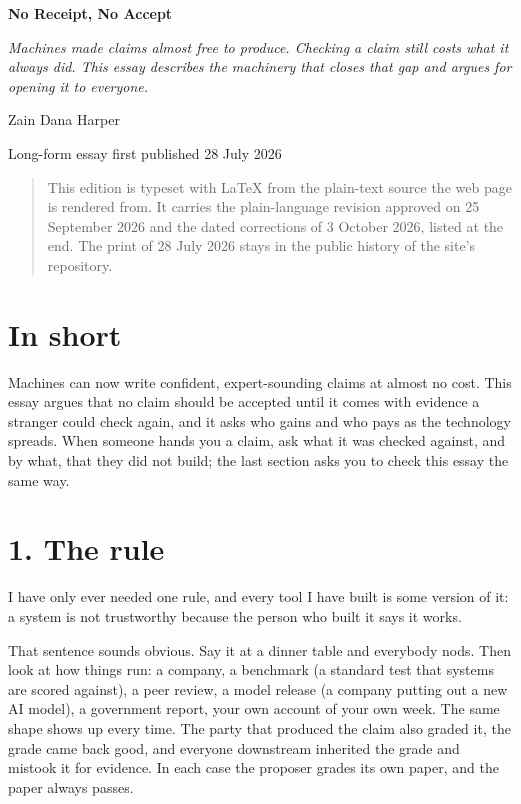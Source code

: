 \documentclass[11pt]{article}
\begin{document}
\begin{center}
{\LARGE\bfseries No Receipt, No Accept\par}
\medskip
{\large\emph{Machines made claims almost free to produce. Checking a claim still costs what it always did. This essay describes the machinery that closes that gap and argues for opening it to everyone.}\par}
\medskip
Zain Dana Harper\par
{\small Long-form essay \textperiodcentered{} first published 28 July 2026\par}
\end{center}

\begin{quote}\small
This edition is typeset with LaTeX from the plain-text source the web page is rendered from. It carries the plain-language revision approved on 25 September 2026 and the dated corrections of 3 October 2026, listed at the end. The print of 28 July 2026 stays in the public history of the site's repository.
\end{quote}

\section*{In short}

Machines can now write confident, expert-sounding claims at almost no cost. This essay argues that no claim should be accepted until it comes with evidence a stranger could check again, and it asks who gains and who pays as the technology spreads. When someone hands you a claim, ask what it was checked against, and by what, that they did not build; the last section asks you to check this essay the same way.

\section*{1. The rule}

I have only ever needed one rule, and every tool I have built is some version of it: a system is not trustworthy because the person who built it says it works.

That sentence sounds obvious. Say it at a dinner table and everybody nods. Then look at how things run: a company, a benchmark (a standard test that systems are scored against), a peer review, a model release (a company putting out a new AI model), a government report, your own account of your own week. The same shape shows up every time. The party that produced the claim also graded it, the grade came back good, and everyone downstream inherited the grade and mistook it for evidence. In each case the proposer grades its own paper, and the paper always passes.
\end{document}
